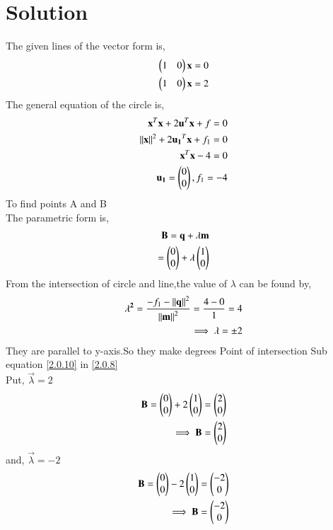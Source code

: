 \documentclass[journal,12pt,twocolumn]{IEEEtran}
\begin{document}
\section{Solution}
The given lines of the vector form is,
\begin{align}
\begin{pmatrix}1 & 0\end{pmatrix}\mathbf{x}=0
\\
\begin{pmatrix}1 & 0\end{pmatrix}\mathbf{x}=2
\end{align}
The general equation of the circle is,
\begin{align}
\mathbf{x}^T\mathbf{x} + 2\mathbf{u}^T\mathbf{x} + f = 0  
\\
\left\lVert\mathbf{x}\right\rVert^2 + 2\mathbf{u_1}^T\mathbf{x} + f_1 = 0
\\
\mathbf{x}^T\mathbf{x}- 4 = 0
\\
\mathbf{u_1} = \begin{pmatrix}0 \\ 0\end{pmatrix},f_1=-4
\end{align}
To find points A and B
\\
The parametric form is,
\begin{align}
\mathbf{B}=\mathbf{q}+\lambda \mathbf{m}\\
=\begin{pmatrix}0\\0\end{pmatrix}+\lambda \begin{pmatrix}1\\0\end{pmatrix} \label{2.0.8}
\end{align}
From the intersection of circle and line,the value of $\lambda$ can be found by,
\begin{align}
\mathbf{\lambda^2}=\frac{{{-f_1}-\left\lVert\mathbf{q}\right\rVert^2 }}{{\left\lVert\mathbf{m}\right\rVert^2}}=\frac{{{4}-{0} }}{{ {1 }}}=4
\\
\implies \mathbf{\lambda}=\pm{2} \label{2.0.10}
\end{align}
They are parallel to y-axis.So they make  degrees
 Point of intersection
Sub equation \eqref{2.0.10} in \eqref{2.0.8}
\\
Put, $\vec{\lambda}= 2$
\begin{align}
\mathbf{B}=\begin{pmatrix}0\\0\end{pmatrix}+2\begin{pmatrix}1\\ 0\end{pmatrix}=\begin{pmatrix}2 \\ 0\end{pmatrix}
\\ 
\implies\mathbf{B}=\begin{pmatrix}2\\0\end{pmatrix}
\end{align}
and, $\vec{\lambda}=-2$
\begin{align}
\mathbf{B}=\begin{pmatrix}0 \\0\end{pmatrix}-2\begin{pmatrix}1\\0\end{pmatrix}=\begin{pmatrix}-2 \\ 0\end{pmatrix}
\\ 
\implies\mathbf{B}=\begin{pmatrix}-2\\ 0\end{pmatrix}
\end{align}
\end{document}
